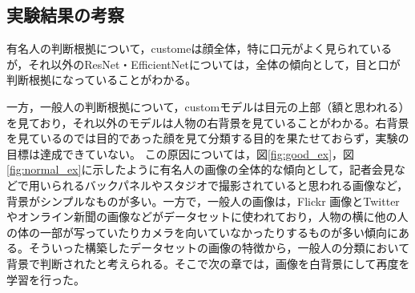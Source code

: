\documentclass[a4paper,11pt,titlepage]{jsarticle}
\begin{document}
\subsection{実験結果の考察}
有名人の判断根拠について，customeは顔全体，特に口元がよく見られているが，それ以外のResNet・EfficientNetについては，全体の傾向として，目と口が判断根拠になっていることがわかる。\par
一方，一般人の判断根拠について，customモデルは目元の上部（額と思われる）を見ており，それ以外のモデルは人物の右背景を見ていることがわかる。右背景を見ているのでは目的であった顔を見て分類する目的を果たせておらず，実験の目標は達成できていない。
この原因については，図\ref{fig:good_ex}，図\ref{fig:normal_ex}に示したように有名人の画像の全体的な傾向として，記者会見などで用いられるバックパネルやスタジオで撮影されていると思われる画像など，背景がシンプルなものが多い。一方で，一般人の画像は，Flickr 画像とTwitterやオンライン新聞の画像などがデータセットに使われており，人物の横に他の人の体の一部が写っていたりカメラを向いていなかったりするものが多い傾向にある。そういった構築したデータセットの画像の特徴から，一般人の分類において背景で判断されたと考えられる。そこで次の章では，画像を白背景にして再度を学習を行った。
\end{document}
